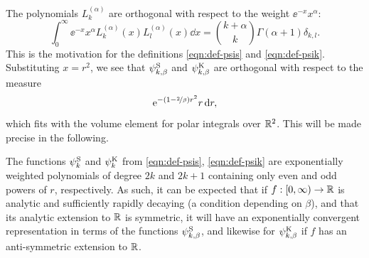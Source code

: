 The polynomials $L_k^{(\alpha)}$ are orthogonal with respect to the weight $\ee^{-x}x^\alpha$: 
\begin{equation} \label{eqn:lag-orth}
    \int_0^\infty \ee^{-x}x^\alpha L^{(\alpha)}_k(x) L^{(\alpha)}_l(x) \dd x 
    = \binom{k+\alpha}{k} \Gamma(\alpha + 1) \delta_{k,l}.
\end{equation}
This is the motivation for the definitions \eqref{eqn:def-psis} and \eqref{eqn:def-psik}. Substituting
$x=r^2$, we see that $\psi_{k,\beta}^{\mathrm{S}}$ and $\psi_{k,\beta}^{\mathrm{K}}$ are orthogonal with respect to the
measure
\[
    \mathrm{e}^{-(1-\nicefrac{2}{\beta})r^2} r \,\mathrm{d} r,
\]
which fits with the volume element for polar integrals over $\mathbb{R}^2$. This will be made precise in the
following.

The functions $\psi_k^{\mathrm{S}}$ and $\psi_k^{\mathrm{K}}$ from \eqref{eqn:def-psis}, \eqref{eqn:def-psik} are
exponentially weighted polynomials of degree $2k$ and $2k+1$ containing only even and odd powers of $r$,
respectively. As such, it can be expected that if $f : [0,\infty) \to \mathbb{R}$ is analytic and sufficiently rapidly
decaying (a condition depending on $\beta$), and that its analytic extension to $\mathbb{R}$ is symmetric, it will
have an exponentially convergent representation in terms of the functions $\psi_{k,\beta}^{\mathrm{S}}$, and likewise
for $\psi_{k,\beta}^{\mathrm{K}}$ if $f$ has an anti-symmetric extension to $\mathbb{R}$.

